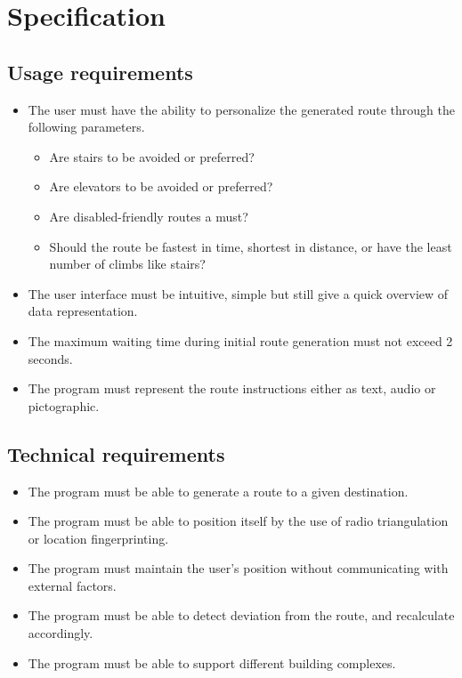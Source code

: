 \section{Specification} %
\label{sec:specification}

\subsection{Usage requirements}

\begin{itemize}
	\item The user must have the ability to personalize the generated route through the following parameters.
			\begin{itemize}
				\item Are stairs to be avoided or preferred?
				\item Are elevators to be avoided or preferred?
				\item Are disabled-friendly routes a must?
				\item Should the route be fastest in time, shortest in distance, or have the least number of climbs like stairs?
			\end{itemize}

	\item The user interface must be intuitive, simple but still give a quick overview of data representation.
	\item The maximum waiting time during initial route generation must not exceed 2 seconds.
	\item The program must represent the route instructions either as text, audio or pictographic.
\end{itemize}


\subsection{Technical requirements}

\begin{itemize}
	\item The program must be able to generate a route to a given destination.
	\item The program must be able to position itself by the use of radio triangulation or location fingerprinting.
	\item The program must maintain the user's position without communicating with external factors.
	\item The program must be able to detect deviation from the route, and recalculate accordingly.
	\item The program must be able to support different building complexes.
\end{itemize}



